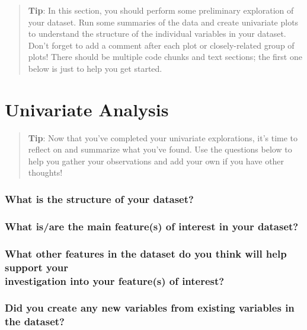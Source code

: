 \documentclass[]{article}
\begin{document}
\begin{quote}
\textbf{Tip}: In this section, you should perform some preliminary
exploration of your dataset. Run some summaries of the data and create
univariate plots to understand the structure of the individual variables
in your dataset. Don't forget to add a comment after each plot or
closely-related group of plots! There should be multiple code chunks and
text sections; the first one below is just to help you get started.
\end{quote}

\section{Univariate Analysis}\label{univariate-analysis}

\begin{quote}
\textbf{Tip}: Now that you've completed your univariate explorations,
it's time to reflect on and summarize what you've found. Use the
questions below to help you gather your observations and add your own if
you have other thoughts!
\end{quote}

\subsubsection{What is the structure of your
dataset?}\label{what-is-the-structure-of-your-dataset}

\subsubsection{What is/are the main feature(s) of interest in your
dataset?}\label{what-isare-the-main-features-of-interest-in-your-dataset}

\subsubsection{\texorpdfstring{What other features in the dataset do you
think will help support your\\
investigation into your feature(s) of
interest?}{What other features in the dataset do you think will help support your investigation into your feature(s) of interest?}}\label{what-other-features-in-the-dataset-do-you-think-will-help-support-your-investigation-into-your-features-of-interest}

\subsubsection{Did you create any new variables from existing variables
in the
dataset?}\label{did-you-create-any-new-variables-from-existing-variables-in-the-dataset}
\end{document}
